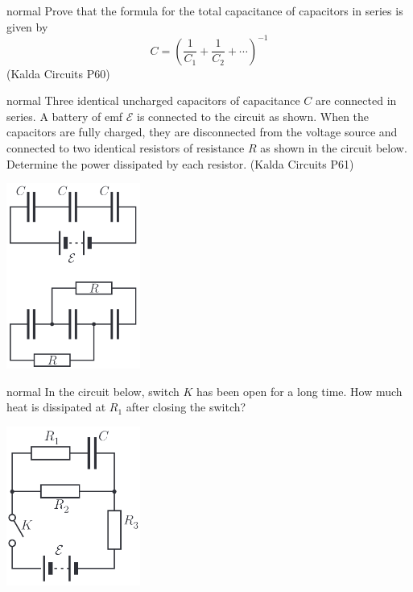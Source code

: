 \hypertarget{P48}{}
\begin{solution}{normal} %
Prove that the formula for the total capacitance of capacitors in series is given by
$$C=\left(\dfrac{1}{C_1}+\dfrac{1}{C_2}+\cdots\right)^{-1}$$
(Kalda Circuits P60)
\end{solution}

\hypertarget{P49}{}
\begin{solution}{normal} %
Three identical uncharged capacitors of capacitance $C$ are connected in series. A battery of emf $\mathcal{E}$ is connected to the circuit as shown. When the capacitors are fully charged, they are disconnected from the voltage source and connected to two identical resistors of resistance $R$ as shown in the circuit below. Determine the power dissipated by each resistor. (Kalda Circuits P61)
\begin{center}
    \includegraphics[width=0.33\textwidth]{S2 Figures/S2-49.png}
\end{center}
\end{solution}

\hypertarget{P50}{}
\begin{solution}{normal} %
In the circuit below, switch $K$ has been open for a long time. How much heat is dissipated at $R_1$ after closing the switch?
\begin{center}
    \includegraphics[width=0.33\textwidth]{S2 Figures/S2-50.png}
\end{center}
\end{solution}

